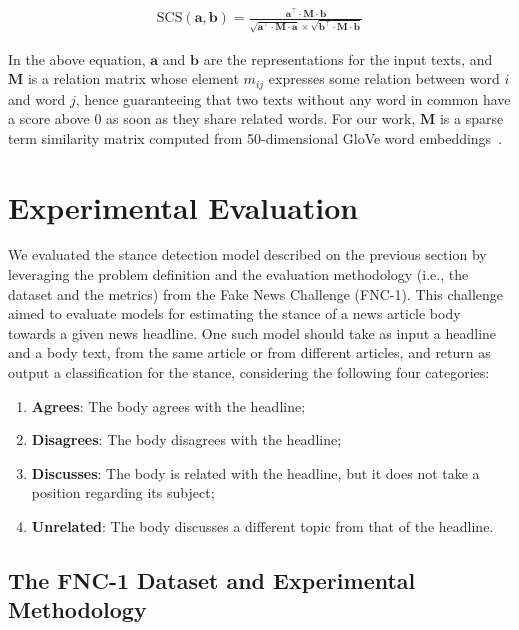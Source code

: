\begin{equation}
\begin{split}
\mathrm{SCS}(\boldsymbol{a}, \boldsymbol{b}) = \frac{\boldsymbol{a}^\top \cdot \boldsymbol{M} \cdot \boldsymbol{b}}{\sqrt{\boldsymbol{a}^\top \cdot \boldsymbol{M} \cdot \boldsymbol{a}} \times \sqrt{\boldsymbol{b}^\top \cdot \boldsymbol{M} \cdot \boldsymbol{b}}}
\end{split}
\label{eq:scs}
\end{equation}

In the above equation, $\boldsymbol{a}$ and $\boldsymbol{b}$ are the representations for the input texts, and $\boldsymbol{M}$ is a relation matrix whose element $m_{ij}$ expresses some relation between word $i$ and word $j$, hence guaranteeing that two texts without any word in common have a score above 0 as soon as they share related words. For our work, $\boldsymbol{M}$ is a sparse term similarity matrix computed from 50-dimensional GloVe word embeddings~\cite{glove}.

\section{Experimental Evaluation}

We evaluated the stance detection model described on the previous section by leveraging the problem definition and the evaluation methodology (i.e., the dataset and the metrics) from the Fake News Challenge (FNC-1). This challenge aimed to evaluate models for estimating the stance of a news article body towards a given news headline. One such model should take as input a headline and a body text, from the same article or from different articles, and return as output a classification for the stance, considering the following four categories:
\begin{enumerate}
\item \textbf{Agrees}: The body agrees with the headline;
\item \textbf{Disagrees}: The body disagrees with the headline;
\item \textbf{Discusses}: The body is related with the headline, but it does not take a position regarding its subject;
\item \textbf{Unrelated}: The body discusses a different topic from that of the headline.
\end{enumerate}

\subsection{The FNC-1 Dataset and Experimental Methodology}

